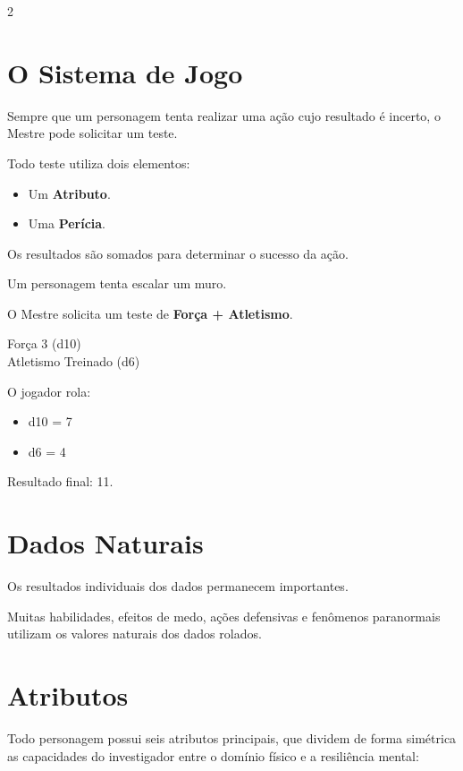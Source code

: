 \documentclass[a4paper,11pt,openany]{book}
\begin{document}
\begin{multicols}{2}

\section{O Sistema de Jogo}

Sempre que um personagem tenta realizar uma ação cujo resultado é incerto, o Mestre pode solicitar um teste.

Todo teste utiliza dois elementos:

\begin{itemize}
\item Um \textbf{Atributo}.
\item Uma \textbf{Perícia}.
\end{itemize}

Os resultados são somados para determinar o sucesso da ação.

\begin{exemplo}
Um personagem tenta escalar um muro.

O Mestre solicita um teste de \textbf{Força + Atletismo}.

Força 3 (d10) \\
Atletismo Treinado (d6)

O jogador rola:
\begin{itemize}
\item d10 = 7
\item d6 = 4
\end{itemize}

Resultado final: 11.
\end{exemplo}

\section{Dados Naturais}

Os resultados individuais dos dados permanecem importantes.

Muitas habilidades, efeitos de medo, ações defensivas e fenômenos paranormais utilizam os valores naturais dos dados rolados.

\section{Atributos}

Todo personagem possui seis atributos principais, que dividem de forma simétrica as capacidades do investigador entre o domínio físico e a resiliência mental:


\end{multicols}
\end{document}
